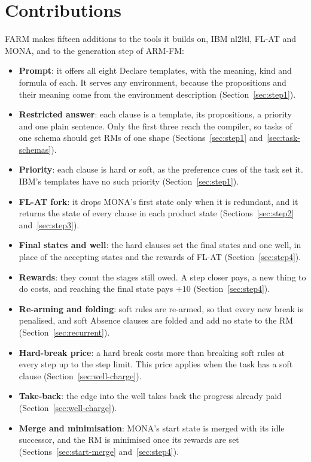 \documentclass[11pt,english,listoffigures,listoftables]{tfgetsinf}
\newcommand{\gain}[1]{\textcolor{green!40!black}{\bfseries\boldmath #1}}  %
\begin{document}
\section{Contributions}
\label{app:contributions}
FARM makes fifteen additions to the tools it builds on, IBM nl2ltl, FL-AT and MONA, and to the generation step of ARM-FM:
\begin{itemize}
    \item \textbf{Prompt}: it offers all eight Declare templates, with the meaning, kind and formula of each. It serves any environment, because the propositions and their meaning come from the environment description (Section~\ref{sec:step1}).
    \item \textbf{Restricted answer}: each clause is a template, its propositions, a priority and one plain sentence. Only the first three reach the compiler, so tasks of one schema should get RMs of one shape (Sections~\ref{sec:step1} and~\ref{sec:task-schemas}).
    \item \textbf{Priority}: each clause is hard or soft, as the preference cues of the task set it. IBM's templates have no such priority (Section~\ref{sec:step1}).
    \item \textbf{FL-AT fork}: it drops MONA's first state only when it is redundant, and it returns the state of every clause in each product state (Sections~\ref{sec:step2} and~\ref{sec:step3}).
    \item \textbf{Final states and well}: the hard clauses set the final states and one well, in place of the accepting states and the rewards of FL-AT (Section~\ref{sec:step4}).
    \item \textbf{Rewards}: they count the stages still owed. A step closer pays, a new thing to do costs, and reaching the final state pays \gain{$+10$} (Section~\ref{sec:step4}).
    \item \textbf{Re-arming and folding}: soft rules are re-armed, so that every new break is penalised, and soft Absence clauses are folded and add no state to the RM (Section~\ref{sec:recurrent}).
    \item \textbf{Hard-break price}: a hard break costs more than breaking soft rules at every step up to the step limit. This price applies when the task has a soft clause (Section~\ref{sec:well-charge}).
    \item \textbf{Take-back}: the edge into the well takes back the progress already paid (Section~\ref{sec:well-charge}).
    \item \textbf{Merge and minimisation}: MONA's start state is merged with its idle successor, and the RM is minimised once its rewards are set (Sections~\ref{sec:start-merge} and~\ref{sec:step4}).

\end{itemize}
\end{document}

